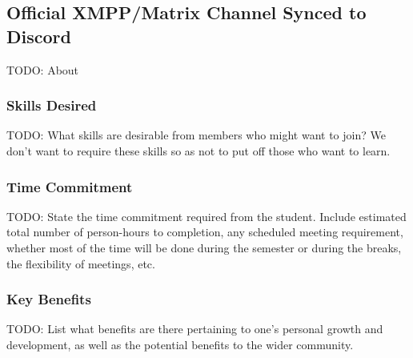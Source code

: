\documentclass[../proposal-for-projects-2025.tex]{subfiles}
\begin{document}
\subsection{Official XMPP/Matrix Channel Synced to Discord}

TODO: About

\subsubsection*{Skills Desired}

TODO: What skills are desirable from members who might want to join?  We don't want to require these skills so as not to put off those who want to learn.

\subsubsection*{Time Commitment}

TODO: State the time commitment required from the student.  Include estimated total number of person-hours to completion, any scheduled meeting requirement, whether most of the time will be done during the semester or during the breaks, the flexibility of meetings, etc.

\subsubsection*{Key Benefits}

TODO: List what benefits are there pertaining to one's personal growth and development, as well as the potential benefits to the wider community.
\end{document}

